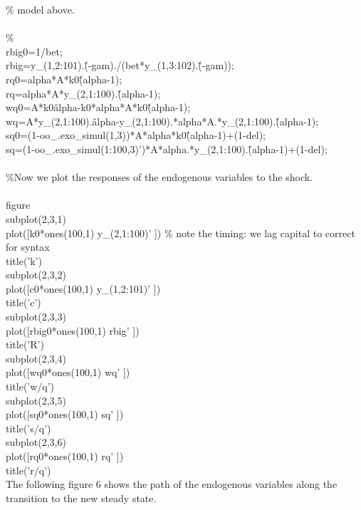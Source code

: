 \documentclass[a4paper,12pt]{scrartcl} %
\begin{document}
{\% model above.\\
\\
\%%
\\
rbig0=1/bet;\\
rbig=y\_(1,2:101).\^(-gam)./(bet*y\_(1,3:102).\^(-gam));\\
rq0=alpha*A*k0\^(alpha-1);\\
rq=alpha*A*y\_(2,1:100).\^(alpha-1);\\
wq0=A*k0\^alpha-k0*alpha*A*k0\^(alpha-1);\\
wq=A*y\_(2,1:100).\^alpha-y\_(2,1:100).*alpha*A.*y\_(2,1:100).\^(alpha-1);\\
sq0=(1-oo\_.exo\_simul(1,3))*A*alpha*k0\^(alpha-1)+(1-del);\\
sq=(1-oo\_.exo\_simul(1:100,3)')*A*alpha.*y\_(2,1:100).\^(alpha-1)+(1-del);\\
\\
\%Now we plot the responses of the endogenous variables to the shock.\\
\\
figure\\
subplot(2,3,1)\\
plot([k0*ones(100,1) y\_(2,1:100)' ]) \% note the timing: we lag capital to correct for syntax\\
title('k')\\
subplot(2,3,2)\\
plot([c0*ones(100,1)  y\_(1,2:101)' ])\\
title('c')\\
subplot(2,3,3)\\
plot([rbig0*ones(100,1) rbig' ])\\
title('R')\\
subplot(2,3,4)\\
plot([wq0*ones(100,1) wq' ])\\
title('w/q')\\
subplot(2,3,5)\\
plot([sq0*ones(100,1) sq' ])\\
title('s/q')\\
subplot(2,3,6)\\
plot([rq0*ones(100,1) rq' ])\\
title('r/q')}\\


The following figure 6 shows the path of the endogenous variables along the transition to the new steady state.
\end{document}
